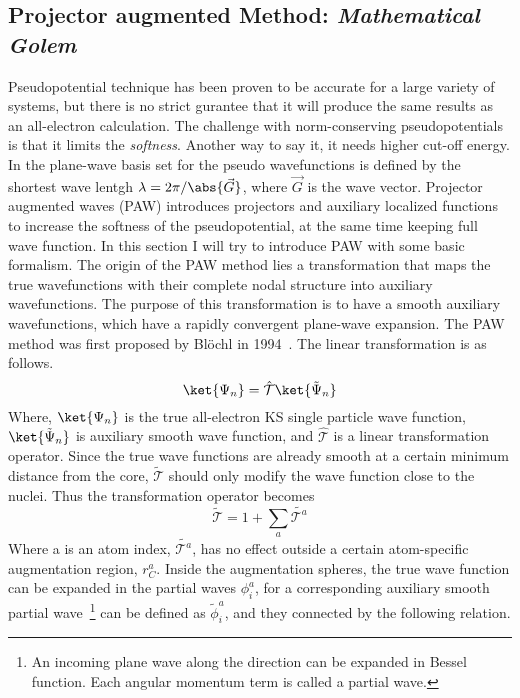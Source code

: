 \subsection{Projector augmented Method: \textit{Mathematical Golem}}
Pseudopotential technique has been proven to be accurate for a large variety of systems, but there is no strict gurantee that it will produce the same results as an all-electron calculation. The challenge with norm-conserving pseudopotentials is that it limits the \textit{softness}. Another way to say it, it needs higher cut-off energy. In the plane-wave basis set for the pseudo wavefunctions is defined by the shortest wave lentgh $\lambda=2\pi/\abs{\vec{G}}$, where $\vec{G}$ is the wave vector. Projector augmented waves (PAW) introduces projectors and auxiliary localized functions to increase the softness of the pseudopotential, at the same time keeping full wave function. In this section I will try to introduce PAW with some basic formalism. The origin of the PAW method lies a transformation that maps the true wavefunctions with their complete nodal structure into auxiliary wavefunctions. The purpose of this transformation is to have a smooth auxiliary wavefunctions, which have a rapidly convergent plane-wave expansion. The PAW method was first proposed by Bl\"ochl in 1994~\cite{blochl1994projector}. The linear transformation is as follows.
\begin{equation}
\ket{\Psi_n} = \hat{\mathcal{T}}\ket{\tilde{\Psi}_n}
\end{equation}
Where, $\ket{\Psi_n}$ is the true all-electron KS single particle wave function, $\ket{\tilde{\Psi}_n}$ is auxiliary smooth wave function, and $\hat{\mathcal{T}}$ is a linear transformation operator. Since the true wave functions are already smooth at a certain minimum distance from the core, $\tilde{\mathcal{T}}$ should only modify the wave function close to the nuclei. Thus the transformation operator becomes
\begin{equation}
\tilde{\mathcal{T}} = 1 + \sum_a \tilde{\mathcal{T}^a}
\end{equation}
Where a is an atom index, $\tilde{\mathcal{T}^a}$, has no effect outside a certain atom-specific augmentation region, $r_C^a$. Inside the augmentation spheres, the true wave function can be expanded in the partial waves $\phi_i^a$, for a corresponding auxiliary smooth partial wave~\footnote{An incoming plane wave along the direction can be expanded in Bessel function. Each angular momentum term is called a partial wave.} can be defined as $\tilde{\phi}_i^a$, and they connected by the following relation.
